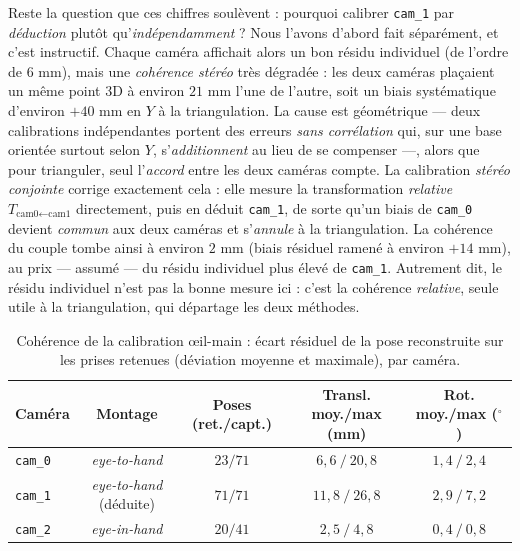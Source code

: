 Reste la question que ces chiffres soulèvent : pourquoi calibrer \texttt{cam\_1} par \emph{déduction} plutôt qu'\emph{indépendamment} ? Nous l'avons d'abord fait séparément, et c'est instructif. Chaque caméra affichait alors un bon résidu individuel (de l'ordre de $6$ mm), mais une \emph{cohérence stéréo} très dégradée : les deux caméras plaçaient un même point 3D à environ $21$ mm l'une de l'autre, soit un biais systématique d'environ $+40$ mm en $Y$ à la triangulation. La cause est géométrique --- deux calibrations indépendantes portent des erreurs \emph{sans corrélation} qui, sur une base orientée surtout selon $Y$, s'\emph{additionnent} au lieu de se compenser ---, alors que pour trianguler, seul l'\emph{accord} entre les deux caméras compte. La calibration \emph{stéréo conjointe} corrige exactement cela : elle mesure la transformation \emph{relative} $T_{\text{cam0}\leftarrow\text{cam1}}$ directement, puis en déduit \texttt{cam\_1}, de sorte qu'un biais de \texttt{cam\_0} devient \emph{commun} aux deux caméras et s'\emph{annule} à la triangulation. La cohérence du couple tombe ainsi à environ $2$ mm (biais résiduel ramené à environ $+14$ mm), au prix --- assumé --- du résidu individuel plus élevé de \texttt{cam\_1}. Autrement dit, le résidu individuel n'est pas la bonne mesure ici : c'est la cohérence \emph{relative}, seule utile à la triangulation, qui départage les deux méthodes.

\begin{table}[t]
  \centering
  \caption{Cohérence de la calibration œil-main : écart résiduel de la pose reconstruite sur les prises retenues (déviation moyenne et maximale), par caméra.}
  \label{tab:handeye-valid}
  \small
  \setlength{\tabcolsep}{4.5pt}
  \begin{tabular}{lcccc}
    \toprule
    Caméra & Montage & Poses (ret./capt.) & Transl. moy./max (mm) & Rot. moy./max ($^{\circ}$) \\
    \midrule
    \texttt{cam\_0} & \emph{eye-to-hand}           & $23/71$ & $6{,}6\ /\ 20{,}8$  & $1{,}4\ /\ 2{,}4$ \\
    \texttt{cam\_1} & \emph{eye-to-hand} (déduite) & $71/71$ & $11{,}8\ /\ 26{,}8$ & $2{,}9\ /\ 7{,}2$ \\
    \texttt{cam\_2} & \emph{eye-in-hand}           & $20/41$ & $2{,}5\ /\ 4{,}8$   & $0{,}4\ /\ 0{,}8$ \\
    \bottomrule
  \end{tabular}
\end{table}

